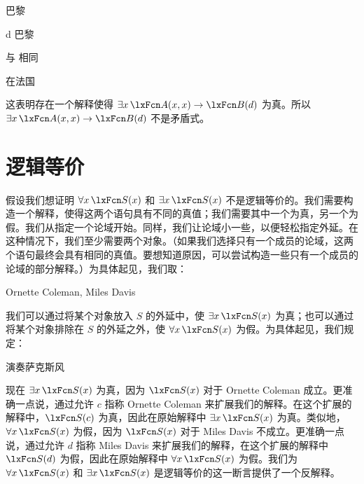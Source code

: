 \begin{ekey}
		\item[\text{论域}] 巴黎
		\item[d] 巴黎
		\item[\atom{A}{x,y}]  与  相同
		\item[\atom{B}{x}]  在法国
	\end{ekey}


这表明存在一个解释使得 $\exists x\,\atom{A}{x,x} \eif \atom{B}{d}$ 为真。所以 $\exists x\, \atom{A}{x,x} \eif \atom{B}{d}$ 不是矛盾式。

\section{逻辑等价}
假设我们想证明 $\forall x\, \atom{S}{x}$ 和 $\exists x\, \atom{S}{x}$ 不是逻辑等价的。我们需要构造一个解释，使得这两个语句具有不同的真值；我们需要其中一个为真，另一个为假。我们从指定一个论域开始。同样，我们让论域小一些，以便轻松指定外延。在这种情况下，我们至少需要两个对象。（如果我们选择只有一个成员的论域，这两个语句最终会具有相同的真值。要想知道原因，可以尝试构造一些只有一个成员的论域的部分解释。）为具体起见，我们取：


\begin{ekey}
		\item[\text{论域}] Ornette Coleman, Miles Davis
	\end{ekey}


我们可以通过将某个对象放入 $S$ 的外延中，使 $\exists x\, \atom{S}{x}$ 为真；也可以通过将某个对象排除在 $S$ 的外延之外，使 $\forall x\, \atom{S}{x}$ 为假。为具体起见，我们规定：


\begin{ekey}
		\item[\atom{S}{x}]  演奏萨克斯风
	\end{ekey}


现在 $\exists x\, \atom{S}{x}$ 为真，因为 $\atom{S}{x}$ 对于 Ornette Coleman 成立。更准确一点说，通过允许 $c$ 指称 Ornette Coleman 来扩展我们的解释。在这个扩展的解释中，$\atom{S}{c}$ 为真，因此在原始解释中 $\exists x\, \atom{S}{x}$ 为真。类似地，$\forall x\, \atom{S}{x}$ 为假，因为 $\atom{S}{x}$ 对于 Miles Davis 不成立。更准确一点说，通过允许 $d$ 指称 Miles Davis 来扩展我们的解释，在这个扩展的解释中 $\atom{S}{d}$ 为假，因此在原始解释中 $\forall x\, \atom{S}{x}$ 为假。我们为 $\forall x\, \atom{S}{x}$ 和 $\exists x\, \atom{S}{x}$ 是逻辑等价的这一断言提供了一个反解释。

